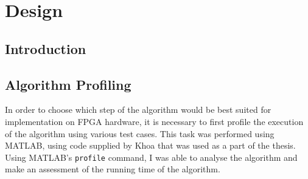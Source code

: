 \chapter{Design}
\label{ch:design}

\section{Introduction}
\label{sec:designIntroduction}


\section{Algorithm Profiling}
\label{sec:algorithmProfiling}
In order to choose which step of the algorithm would be best suited for 
implementation on FPGA hardware, it is necessary to first profile the execution 
of the algorithm using various test cases. This task was performed using MATLAB,
using code supplied by Khoa that was used as a part of the thesis. Using 
MATLAB's \verb+profile+ command, I was able to analyse the algorithm and make an
assessment of the running time of the algorithm.

\subsection{}

